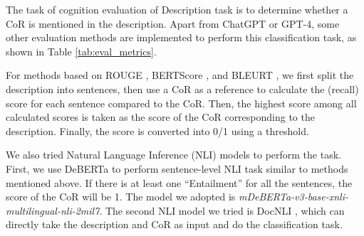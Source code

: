 The task of cognition evaluation of Description task is to determine whether a CoR is mentioned in the description. 
Apart from ChatGPT or GPT-4, some other evaluation methods are implemented to perform this classification task, as shown in Table \ref{tab:eval_metrics}.

For methods based on ROUGE \cite{lin2004rouge}, BERTScore \cite{bertscore}, and BLEURT \cite{sellam2020bleurt},
we first split the description into sentences, then use a CoR as a reference to calculate the (recall) score for each sentence compared to the CoR. 
Then, the highest score among all calculated scores is taken as the score of the CoR corresponding to the description.
Finally, the score is converted into 0/1 using a threshold. 

We also tried Natural Language Inference (NLI) models to perform the task. 
First, we use DeBERTa \cite{he2021deberta} to perform sentence-level NLI task similar to methods mentioned above. 
If there is at least one ``Entailment'' for all the sentences, the score of the CoR will be 1.
The model we adopted is \textit{mDeBERTa-v3-base-xnli-multilingual-nli-2mil7}.
The second NLI model we tried is DocNLI \cite{yin-etal-2021-docnli}, which can directly take the description and CoR as input and do the classification task. 



